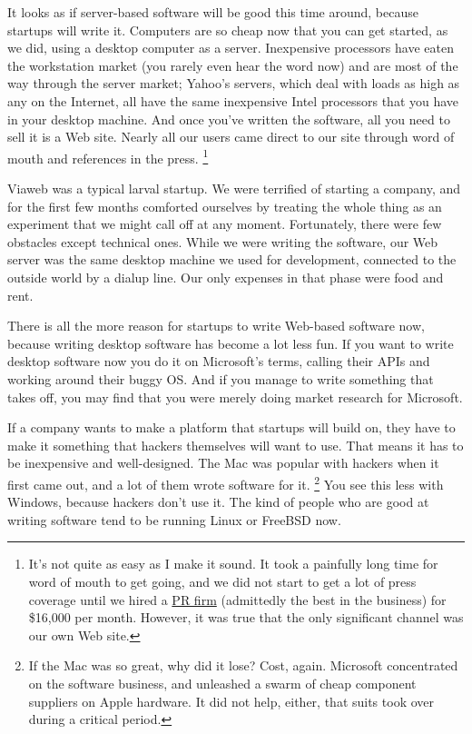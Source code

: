 \documentclass[12pt]{book}
\begin{document}
It looks as if server-based software will be good this time around,
because startups will write it. Computers are so cheap now that you can
get started, as we did, using a desktop computer as a server.
Inexpensive processors have eaten the workstation market (you rarely
even hear the word now) and are most of the way through the server
market; Yahoo's servers, which deal with loads as high as any on the
Internet, all have the same inexpensive Intel processors that you have
in your desktop machine. And once you've written the software, all you
need to sell it is a Web site. Nearly all our users came direct to our
site through word of mouth and references in the press. \footnote{It's not quite as easy as I make it sound. It took a painfully
long time for word of mouth to get going, and we did not start to get a
lot of press coverage until we hired a
\href{http://www.schwartz-pr.com}{PR firm} (admittedly the best in the
business) for \$16,000 per month. However, it was true that the only
significant channel was our own Web site.}

Viaweb was a typical larval startup. We were terrified of starting a
company, and for the first few months comforted ourselves by treating
the whole thing as an experiment that we might call off at any moment.
Fortunately, there were few obstacles except technical ones. While we
were writing the software, our Web server was the same desktop machine
we used for development, connected to the outside world by a dialup
line. Our only expenses in that phase were food and rent.

There is all the more reason for startups to write Web-based software
now, because writing desktop software has become a lot less fun. If you
want to write desktop software now you do it on Microsoft's terms,
calling their APIs and working around their buggy OS. And if you manage
to write something that takes off, you may find that you were merely
doing market research for Microsoft.

If a company wants to make a platform that startups will build on, they
have to make it something that hackers themselves will want to use. That
means it has to be inexpensive and well-designed. The Mac was popular
with hackers when it first came out, and a lot of them wrote software
for it. \footnote{If the Mac was so great, why did it lose? Cost, again.
Microsoft concentrated on the software business, and unleashed a swarm
of cheap component suppliers on Apple hardware. It did not help, either,
that suits took over during a critical period.} You see this less with Windows, because hackers don't
use it. The kind of people who are good at writing software tend to be
running Linux or FreeBSD now.
\end{document}

